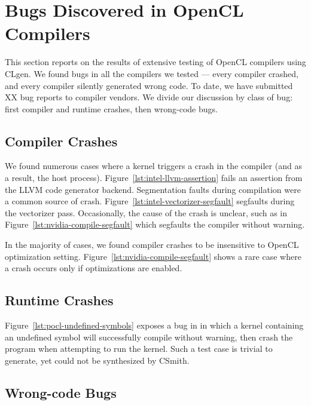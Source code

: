 \section{Bugs Discovered in OpenCL Compilers}

This section reports on the results of extensive testing of OpenCL compilers using CLgen. We found bugs in all the compilers we tested --- every compiler crashed, and every compiler silently generated wrong code. To date, we have submitted XX bug reports to compiler vendors. We divide our discussion by class of bug: first compiler and runtime crashes, then wrong-code bugs.

\subsection{Compiler Crashes}

We found numerous cases where a kernel triggers a crash in the compiler (and as a result, the host process). Figure~\ref{lst:intel-llvm-assertion} fails an assertion from the LLVM code generator backend. Segmentation faults during compilation were a common source of crash. Figure~\ref{lst:intel-vectorizer-segfault} segfaults during the vectorizer pass. Occasionally, the cause of the crash is unclear, such as in Figure~\ref{lst:nvidia-compile-segfault} which segfaults the compiler without warning.

In the majority of cases, we found compiler crashes to be insensitive to OpenCL optimization setting. Figure~\ref{lst:nvidia-compile-segfault} shows a rare case where a crash occurs only if optimizations are enabled.



\subsection{Runtime Crashes}

Figure~\ref{lst:pocl-undefined-symbols} exposes a bug in in which a kernel containing an undefined symbol will successfully compile without warning, then crash the program when attempting to run the kernel. Such a test case is trivial to generate, yet could not be synthesized by CSmith.



\subsection{Wrong-code Bugs}

